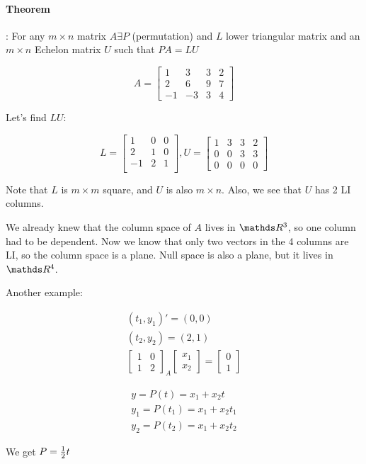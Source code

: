\paragraph{Theorem}: For any $m \times n$ matrix $A \exists P$ (permutation) and $L$ lower triangular matrix and an $m \times n$ Echelon matrix $U$ such that $PA = LU$

\[
	A = \begin{bmatrix}
		1 & 3 & 3 & 2 \\
		2 & 6 & 9 & 7 \\
		-1 & -3 & 3 & 4
	\end{bmatrix}
\]

Let's find $LU$:

\[
	L = \begin{bmatrix}
		1 & 0 & 0\\
		2 & 1 & 0\\
		-1 & 2 & 1 \\
	\end{bmatrix},
	U = \begin{bmatrix}
		1 & 3 & 3 & 2 \\
		0 & 0 & 3 & 3 \\
		0 & 0 & 0 & 0
	\end{bmatrix}
\]

Note that $L$ is $m \times m$ square, and $U$ is also $m \times n$. Also, we see that $U$ has 2 LI columns.

We already knew that the column space of $A$ lives in $\bbR^3$, so one column had to be dependent. Now we know that only two vectors in the 4 columns are LI, so the column space is a plane. Null space is also a plane, but it lives in $\bbR^4$.

Another example:

\[
	\begin{matrix}
		(t_1, y_1)' = (0,0) \\
		(t_2, y_2) = (2,1)\\
		\begin{bmatrix}
			1 & 0 \\ 1 & 2
		\end{bmatrix}_A
		\begin{bmatrix}
			x_1 \\ x_2
		\end{bmatrix} = 
		\begin{bmatrix}
			0 \\ 1
		\end{bmatrix}
	\end{matrix}
\]

\[
	\begin{matrix}
		y = P(t) = x_1 + x_2 t \\
		y_1 = P(t_1) = x_1 + x_2 t_1 \\
		y_2 = P(t_2) = x_1 + x_2 t_2
	\end{matrix}
\]

We get $P = {1 \over 2 } t$